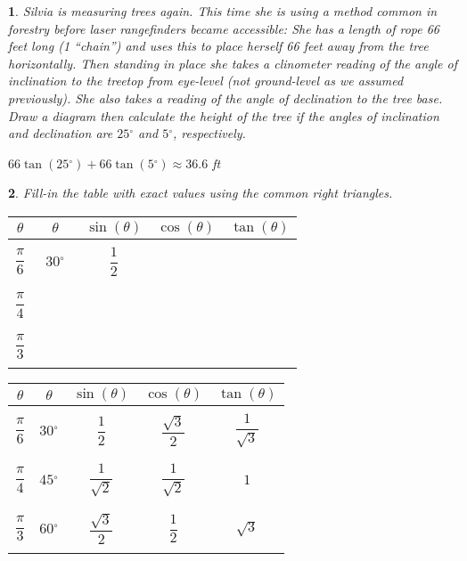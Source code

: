 \documentclass{amsbook}
\newtheorem{exc}{}
\newenvironment{ex}{\begin{exc}\normalfont}{\end{exc}}
\numberwithin{section}{chapter}
\numberwithin{equation}{chapter}
\newcommand{\dg}{{^\circ}}
\begin{document}
\begin{ex}
	Silvia is measuring trees again. This time she is using a method common in forestry before laser rangefinders became accessible: She has a length of rope 66 feet long (1 ``chain'') and uses this to place herself 66 feet away from the tree horizontally. Then standing in place she takes a clinometer reading of the angle of inclination to the treetop from eye-level (not ground-level as we assumed previously). She also takes a reading of the angle of declination to the tree base. Draw a diagram then calculate the height of the tree if the angles of inclination and declination are $25\dg$ and $5\dg$, respectively.
	\begin{sol}
		$66\tan(25\dg)+66\tan(5\dg) \approx 36.6$ ft	
		\end{sol}
\end{ex}

\begin{ex} Fill-in the table with exact values using the common right triangles.
	
	
	{\Large
	\begin{tabular}{|c |c | c | c | c |}
		\hline
		$\theta$ & $\theta $& $\sin(\theta)$ & $\cos(\theta)$ & $\tan(\theta)$ \\
		\hline 
	  & & & &	\\
		$\dfrac{\pi}{6}$ & $\ \ 30\dg\ \ $ &$\ \ \ \dfrac{1}{2}\ \ \ $ & $\ \ \ \ \ \ \ \ $&  $\ \ \ \ \ \ \ \ $\\
	  & & & &	\\
		\hline 
			  & & & &	\\
$\dfrac{\pi}{4}$ &  & & & \\
	  & & & &	\\
		\hline 
			  & & & &	\\
$\dfrac{\pi}{3}$ &  & & & \\
	  & & & &	\\
		\hline
	\end{tabular} }
\begin{sol}
	{\small
\begin{tabular}{|c |c | c | c | c |}
	\hline
	$\theta$ & $\theta $& $\sin(\theta)$ & $\cos(\theta)$ & $\tan(\theta)$ \\
	\hline 
	& & & &	\\
	$\dfrac{\pi}{6}$ & $30\dg$ &$\dfrac{1}{2}$ & $\dfrac{\sqrt{3}}{2}$&  $\dfrac{1}{\sqrt{3}}$\\
	& & & &	\\
	\hline 
	& & & &	\\
	$\dfrac{\pi}{4}$ & $45\dg$ &$\dfrac{1}{\sqrt{2}}$ &$\dfrac{1}{\sqrt{2}}$ &  $1$\\
	& & & &	\\
	\hline 
	& & & &	\\
	$\dfrac{\pi}{3}$ & $60\dg$ &$\dfrac{\sqrt{3}}{2}$ &$\dfrac{1}{2}$ &  $\sqrt{3}$\\
	& & & &	\\
	\hline
\end{tabular}	
}
\end{sol}
\end{ex}
\end{document}

